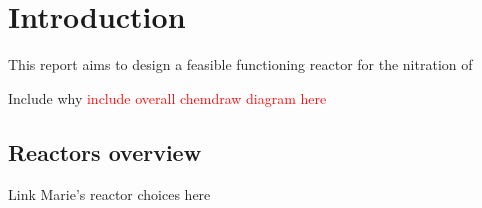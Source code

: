 \section{Introduction}
This report aims to design a feasible functioning reactor for the nitration of 

Include why 
\textcolor{red}{include overall chemdraw diagram here}
\subsection{Reactors overview}
Link Marie's reactor choices here


